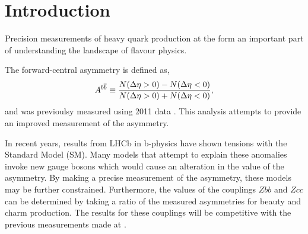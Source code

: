 \section{Introduction} \label{sec:introduction}
Precision measurements of heavy quark production at the \lhc form an important part of understanding the landscape of flavour physics.

The forward-central asymmetry is defined as,
\begin{equation}\label{eq:Abb}
    A^{{b}{\overline {{b}}}} \equiv \frac{N(\Delta\eta > 0) - N(\Delta\eta < 0)}{N(\Delta\eta > 0) + N(\Delta\eta < 0)},
\end{equation}
and was previoulsy measured using 2011 data \cite{LHCb-PAPER-2014-023}. This analysis attempts to provide an improved measurement of the asymmetry.

In recent years, results from LHCb in b-physics have shown tensions with the Standard Model (SM). Many models that attempt to explain these anomalies invoke new gauge bosons which would cause an alteration in the value of the asymmetry. By making a precise measurement of the asymmetry, these models may be further constrained. Furthermore, the values of the couplings $Zbb$ and $Zcc$ can be determined by taking a ratio of the measured asymmetries for beauty and charm production. The results for these couplings will be competitive with the previous measurements made at \lep. 